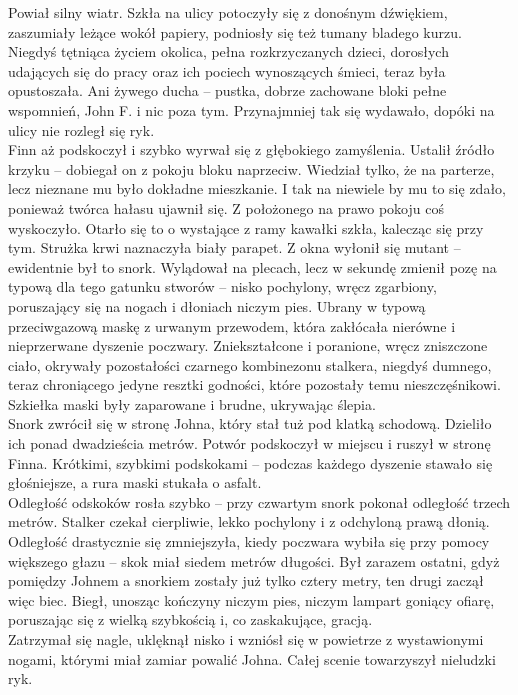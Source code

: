 \documentclass[../MAIN.tex]{subfiles}
\begin{document}
Powiał silny wiatr. Szkła na ulicy potoczyły się z donośnym dźwiękiem, zaszumiały leżące wokół papiery, podniosły się też tumany bladego kurzu. Niegdyś tętniąca życiem okolica, pełna rozkrzyczanych dzieci, dorosłych udających się do pracy oraz ich pociech wynoszących śmieci, teraz była opustoszała. Ani żywego ducha -- pustka, dobrze zachowane bloki pełne wspomnień, John F. i nic poza tym. Przynajmniej tak się wydawało, dopóki na ulicy nie rozległ się ryk. \\
Finn aż podskoczył i szybko wyrwał się z głębokiego zamyślenia. Ustalił źródło krzyku -- dobiegał on z pokoju bloku naprzeciw. Wiedział tylko, że na parterze, lecz nieznane mu było dokładne mieszkanie. I tak na niewiele by mu to się zdało, ponieważ twórca hałasu ujawnił się. Z położonego na prawo pokoju coś wyskoczyło. Otarło się to o wystające z ramy kawałki szkła, kalecząc się przy tym. Strużka krwi naznaczyła biały parapet.
Z okna wyłonił się mutant -- ewidentnie był to snork. Wylądował na plecach, lecz w sekundę zmienił pozę na typową dla tego gatunku stworów -- nisko pochylony, wręcz zgarbiony, poruszający się na nogach i dłoniach niczym pies. Ubrany w typową przeciwgazową maskę z urwanym przewodem, która zakłócała nierówne i nieprzerwane dyszenie poczwary. Zniekształcone i poranione, wręcz zniszczone ciało, okrywały pozostałości czarnego kombinezonu stalkera, niegdyś dumnego, teraz chroniącego jedyne resztki godności, które pozostały temu nieszczęśnikowi. Szkiełka maski były zaparowane i brudne, ukrywając ślepia. \\
Snork zwrócił się w stronę Johna, który stał tuż pod klatką schodową. Dzieliło ich ponad dwadzieścia metrów. Potwór podskoczył w miejscu i ruszył w stronę Finna. Krótkimi, szybkimi podskokami -- podczas każdego dyszenie stawało się głośniejsze, a rura maski stukała o asfalt. \\
Odległość odskoków rosła szybko -- przy czwartym snork pokonał odległość trzech metrów. Stalker czekał cierpliwie, lekko pochylony i z odchyloną prawą dłonią. \\
Odległość drastycznie się zmniejszyła, kiedy poczwara wybiła się przy pomocy większego głazu -- skok miał siedem metrów długości. Był zarazem ostatni, gdyż pomiędzy Johnem a snorkiem zostały już tylko cztery metry, ten drugi zaczął więc biec. Biegł, unosząc kończyny niczym pies, niczym lampart goniący ofiarę, poruszając się z wielką szybkością i, co zaskakujące, gracją. \\
Zatrzymał się nagle, uklęknął nisko i wzniósł się w powietrze z wystawionymi nogami, którymi miał zamiar powalić Johna. Całej scenie towarzyszył nieludzki ryk. \\
\end{document}
